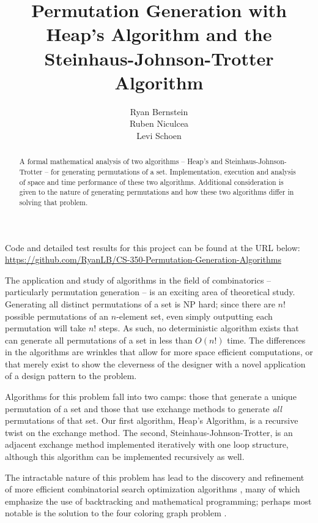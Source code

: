 \documentclass[10pt, oneside]{article}   	%
\title{Permutation Generation with Heap's Algorithm and the Steinhaus-Johnson-Trotter Algorithm}
\author{Ryan Bernstein \\ Ruben Niculcea \\ Levi Schoen}
\date{}							%
\begin{document}
\maketitle
\thispagestyle{empty}

\begin{abstract}
A formal mathematical analysis of two algorithms -- Heap's and Steinhaus-Johnson-Trotter -- for generating permutations of a set. Implementation, execution and analysis of space and time performance of these two algorithms. Additional consideration is given to the nature of generating permutations and how these two algorithms differ in solving that problem.
\end{abstract}

\vspace{2in}

\begin{center}
Code and detailed test results for this project can be found at the URL below:\\
\url{https://github.com/RyanLB/CS-350-Permutation-Generation-Algorithms}
\end{center}

\newpage

\tableofcontents
\thispagestyle{empty}
\newpage

\setcounter{page}{1}

The application and study of algorithms in the field of combinatorics -- particularly permutation generation -- is an exciting area of theoretical study. Generating all distinct permutations of a set is NP hard; since there are $n!$ possible permutations of an $n$-element set, even simply outputting each permutation will take $n!$ steps. As such, no deterministic algorithm exists that can generate all permutations of a set in less than $O(n!)$ time. The differences in the algorithms are wrinkles that allow for more space efficient computations, or that merely exist to show the cleverness of the designer with a novel application of a design pattern to the problem.

Algorithms for this problem fall into two camps: those that generate a unique permutation of a set and those that use exchange methods to generate \emph{all} permutations of that set. Our first algorithm, Heap's Algorithm, is a recursive twist on the exchange method. The second, Steinhaus-Johnson-Trotter, is an adjacent exchange method implemented iteratively with one loop structure, although this algorithm can be implemented recursively as well.

The intractable nature of this problem has lead to the discovery and refinement of more efficient combinatorial search optimization algorithms \cite{sedgewick}, many of which emphasize the use of backtracking and mathematical programming; perhaps most notable is the solution to the four coloring graph problem \cite{lehmer}.  
\end{document}

